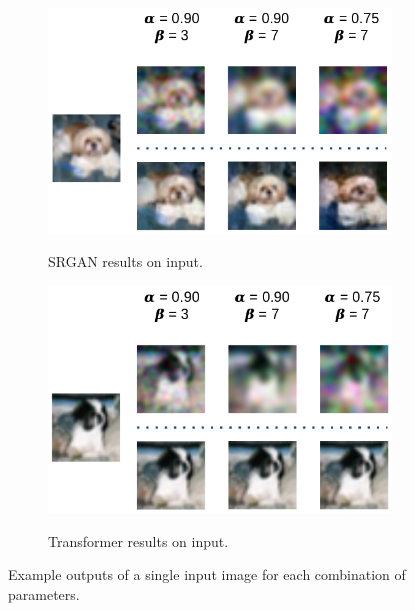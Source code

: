 \documentclass[letterpaper]{article} %
\begin{document}
\begin{figure}[h!]
\centering
\begin{subfigure}{0.45\textwidth}
\begin{center}
\begin{minipage}[t]{\linewidth}
\begin{centering}
{\includegraphics[width=\linewidth]{srgan_outputs.png}}
\caption{SRGAN results on input.}
\label{fig:srgan_outputs}
\end{centering}
\end{minipage}
\end{center}
\end{subfigure}
\begin{subfigure}{0.45\textwidth}
\begin{center}
\begin{minipage}[t]{\linewidth}
\begin{centering}
{\includegraphics[width=\linewidth]{attn_outputs.png}}
\caption{Transformer results on input.}
\label{fig:attn_outputs}
\end{centering}
\end{minipage}
\end{center}
\end{subfigure}
\caption{Example outputs of a single input image for each combination of parameters.}
\label{fig:example_outputs}
\end{figure}
\end{document}
